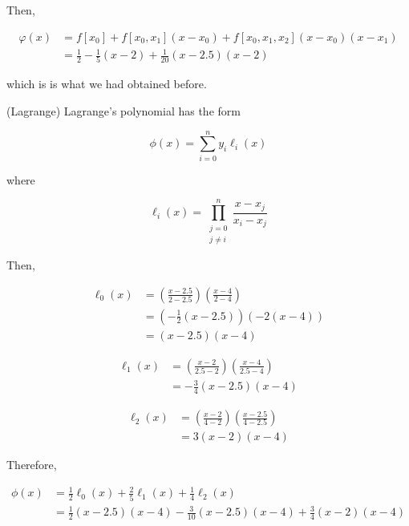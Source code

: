 \documentclass[12pt]{article}
\theoremstyle{definition}
\begin{document}
Then, 


\begin{align*}
\varphi(x) 
&=f[x_0] + f[x_0, x_1](x - x_0) + f[x_0, x_1, x_2](x-x_0)(x-x_1) \\ 
&=\frac{1}{2} - \frac{1}{5}(x-2) + \frac{1}{20}(x-2.5)(x-2)
\end{align*}

which is is what we had obtained before.

(Lagrange) Lagrange's polynomial has the form 

\begin{equation*}
    \phi(x) = \sum_{i=0}^n y_i \ell_i(x)
\end{equation*}

where 

\begin{equation*}
    \ell_i(x) = \prod_{\substack{j=0\\j\neq i}}^n \frac{x-x_j}{x_i - x_j}
\end{equation*}

Then, 

\begin{align*}
    \ell_0(x) 
    &= \left( \frac{x - 2.5}{2 - 2.5} \right) \left( \frac{x -    4}{2 - 4}
    \right) \\ 
    &=\left( -\frac{1}{2}(x - 2.5) \right) \left( -2 (x-4) \right) \\ 
    &=(x-2.5)(x-4)
\end{align*}

\begin{align*}
    \ell_1(x) 
    &= \left( \frac{ x - 2 }{2.5 - 2} \right) \left( \frac{ x - 4 }{2.5
    - 4} \right) \\ 
    &=-\frac{3}{4}(x-2.5)(x-4)
\end{align*}

\begin{align*}
    \ell_2(x) 
    &= \left( \frac{x-2}{4-2} \right) \left( \frac{x-2.5}{4-2.5}
    \right) \\ 
    &=3(x-2)(x-4)
\end{align*}

Therefore,

\begin{align*}
    \phi(x) 
    &= 
    \frac{1}{2}\ell_0(x) + \frac{2}{5}\ell_1(x) + \frac{1}{4} \ell_2(x)\\ 
    &=\frac{1}{2}(x-2.5)(x-4) - \frac{3}{10}(x-2.5)(x-4) + \frac{3}{4}(x-2)(x-4)
\end{align*}

\pagebreak 
\end{document}
